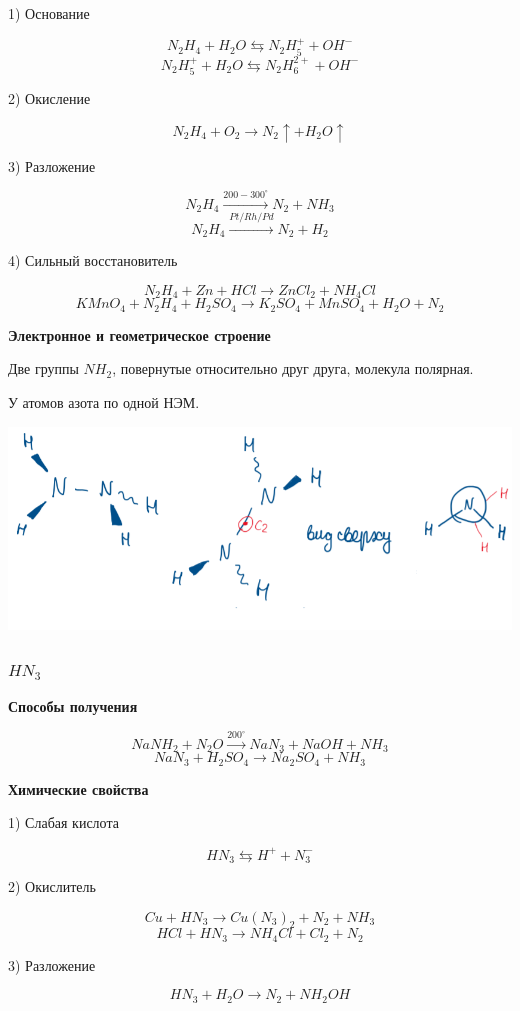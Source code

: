 1) Основание

$$N_2H_4 + H_2O \leftrightarrows N_2H_5^+ + OH^-$$
$$N_2H_5^+ + H_2O \leftrightarrows N_2H_6^{2+} + OH^-$$

2) Окисление

$$N_2H_4 + O_2 \rightarrow N_2\uparrow + H_2O \uparrow$$

3) Разложение

$$N_2H_4 \xrightarrow{200-300^{\circ}} N_2 + NH_3$$
$$N_2H_4 \xrightarrow{Pt/Rh/Pd} N_2 + H_2$$

4) Сильный восстановитель

$$N_2H_4 + Zn + HCl \rightarrow ZnCl_2 + NH_4Cl$$
$$KMnO_4 + N_2H_4 + H_2SO_4 \rightarrow K_2SO_4 + MnSO_4 + H_2O + N_2$$

\textbf{Электронное и геометрическое строение}

Две группы $NH_2$, повернутые относительно друг друга, молекула полярная.

У атомов азота по одной НЭМ.

\includegraphics{images/8v4.png}

\subsubsection*{$HN_3$}

\textbf{Способы получения}

$$NaNH_2 + N_2O \xrightarrow{200^{\circ}} NaN_3 + NaOH + NH_3$$
$$NaN_3 + H_2SO_4 \rightarrow Na_2SO_4 + NH_3$$

\textbf{Химические свойства}

1) Слабая кислота

$$HN_3 \leftrightarrows H^+ + N_3^-$$

2) Окислитель

$$Cu + HN_3 \rightarrow Cu(N_3)_2 + N_2 + NH_3$$
$$HCl + HN_3 \rightarrow NH_4Cl + Cl_2 + N_2$$

3) Разложение

$$HN_3 + H_2O \rightarrow N_2 + NH_2OH$$

